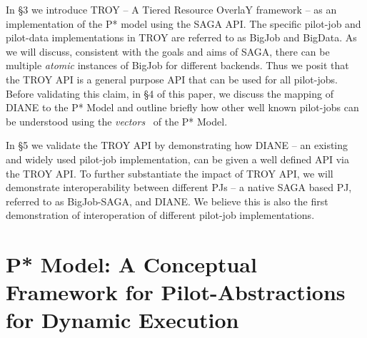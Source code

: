 \documentclass[conference,final]{IEEEtran}
\newcommand{\jhanote}[1]{ {\textcolor{red} { ***shantenu: #1 }}}
\newcommand{\jhanote}[1]{}
\newcommand{\upp}{\vspace*{-0.5em}}
\begin{document}
In \S3 we introduce TROY -- A Tiered Resource OverlaY framework -- as an
implementation of the P* model using the SAGA API. The specific
pilot-job and pilot-data implementations in TROY are referred to as
BigJob and BigData. As we will discuss, consistent with the goals and
aims of SAGA, there can be multiple {\it atomic} instances of BigJob
for different backends.  Thus we posit that the TROY API is a general
purpose API that can be used for all pilot-jobs. Before validating
this claim, in \S4 of this paper, we discuss the mapping of DIANE to
the P* Model and outline briefly how other well known pilot-jobs can
be understood using the {\it vectors}~\cite{dpa_surveypaper} of the P*
Model.

In \S5 we validate the TROY API by demonstrating how DIANE -- an existing and
widely used pilot-job implementation, can be given a well defined API via the
TROY API. To further substantiate the impact of TROY API, we will demonstrate
interoperability between different PJs -- a native SAGA based PJ, referred to as
BigJob-SAGA, and DIANE. We believe this is also the first demonstration of
interoperation of different pilot-job implementations.





\section{P* Model: A Conceptual Framework for Pilot-Abstractions for
  Dynamic Execution \upp\upp}
\label{sec:pilot-model}


\end{document}

